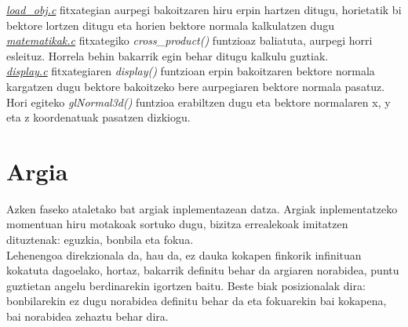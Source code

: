\documentclass[12pt]{article}
\newcommand{\fitxategi}[1] {\underline{\textit{#1}}}
\newcommand{\metodo}[1] {\textit{#1}}
\begin{document}
\fitxategi{load\_obj.c} fitxategian aurpegi bakoitzaren hiru erpin hartzen ditugu, horietatik bi bektore lortzen ditugu eta horien bektore normala kalkulatzen dugu \fitxategi{matematikak.c} fitxategiko \metodo{cross\_product()} funtzioaz baliatuta, aurpegi horri esleituz. Horrela behin bakarrik egin behar ditugu kalkulu guztiak.\\

\fitxategi{display.c} fitxategiaren \metodo{display()} funtzioan erpin bakoitzaren bektore normala kargatzen dugu bektore bakoitzeko bere aurpegiaren bektore normala pasatuz. Hori egiteko \metodo{glNormal3d()} funtzioa erabiltzen dugu eta bektore normalaren x, y eta z koordenatuak pasatzen dizkiogu.\\
 

\section{Argia}

Azken faseko ataletako bat argiak inplementazean datza. Argiak inplementatzeko momentuan hiru motakoak sortuko dugu, bizitza errealekoak imitatzen dituztenak: eguzkia, bonbila eta fokua.\\

Lehenengoa direkzionala da, hau da, ez dauka kokapen finkorik infinituan kokatuta dagoelako, hortaz, bakarrik definitu behar da argiaren norabidea, puntu guztietan angelu berdinarekin igortzen baitu. Beste biak posizionalak dira: bonbilarekin ez dugu norabidea definitu behar da eta fokuarekin bai kokapena, bai norabidea zehaztu behar dira.\\
\end{document}
